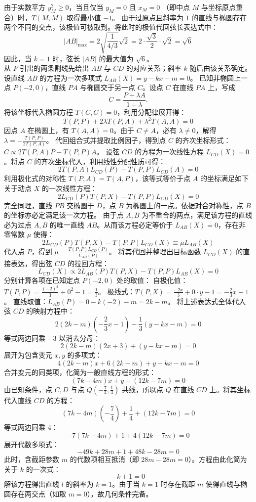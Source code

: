 \begin{solution}
由于实数平方 $y_M^2 \ge 0$，当且仅当 $y_M = 0$ 且 $x_M = 0$ （即中点 $M$ 与坐标原点重合）时，$T(M, M)$ 取得最小值 $-1$。
由于过原点且斜率为 $1$ 的直线与椭圆存在两个不同的交点，该极值可被取到。将此时的极值代回弦长表达式中：
\[ |AB|_{\max} = 2\sqrt{\frac{1}{4/3}} \sqrt{2} = 2 \cdot \frac{\sqrt{3}}{2} \cdot \sqrt{2} = \sqrt{6} \]
因此，当 $k=1$ 时，弦长 $|AB|$ 的最大值为 $\sqrt{6}$。\\
从 $P$ 引出的两条割线先给出 $AB$ 与 $CD$ 的对应关系；斜率 $k$ 随后由该关系确定。
设直线 $AB$ 的方程为一次多项式 $L_{AB}(X) = y - kx - m = 0$。
已知非椭圆上一点 $P(-2, 0)$，直线 $PA$ 与椭圆交于另一点 $C$。设点 $C$ 在直线 $PA$ 上，写成
\[ C = \frac{P + \lambda A}{1+\lambda}. \]
将该坐标代入椭圆方程 $T(C, C) = 0$，利用分配律展开得：
\[ T(P, P) + 2\lambda T(P, A) + \lambda^2 T(A, A) = 0 \]
因点 $A$ 在椭圆上，有 $T(A, A) = 0$。由于 $C \neq A$，必有 $\lambda \neq 0$，解得 $\lambda = -\frac{T(P, P)}{2T(P, A)}$。
代回组合式并提取比例因子，得到点 $C$ 的齐次坐标形式：$C \propto 2T(P, A)P - T(P, P)A$。
设弦 $CD$ 的方程为一次线性方程 $L_{CD}(X) = 0$。将点 $C$ 的齐次坐标代入，利用线性分配性质可得：
\[ 2T(P, A)L_{CD}(P) - T(P, P)L_{CD}(A) = 0 \]
利用极化式的对称性 $T(P, A) = T(A, P)$，该等式等价于点 $A$ 的坐标满足如下关于动点 $X$ 的一次线性方程：
\[ 2L_{CD}(P)T(P, X) - T(P, P)L_{CD}(X) = 0 \]
完全同理，直线 $PB$ 交椭圆于 $D$，点 $B$ 为椭圆上的一点。依据对合对称性，点 $B$ 的坐标亦必定满足该一次方程。
由于点 $A, B$ 为不重合的两点，满足该方程的直线必为过点 $A, B$ 的唯一直线 $AB$。从而该方程必定等价于 $L_{AB}(X) = 0$，存在非零常数 $\mu$ 使得：
\[ 2L_{CD}(P)T(P, X) - T(P, P)L_{CD}(X) \equiv \mu L_{AB}(X) \]
代入点 $P$，得到 $\mu = \frac{T(P, P)L_{CD}(P)}{L_{AB}(P)}$。
将其代回并整理出目标函数 $L_{CD}(X)$ 的直接表达，得出弦 $CD$ 的拉回方程：
\[ L_{CD}(X) \propto 2L_{AB}(P)T(P, X) - T(P, P)L_{AB}(X) = 0 \]
分别计算各项在已知定点 $P(-2, 0)$ 处的取值：
自极化值：$T(P, P) = \frac{(-2)^2}{3} + 0^2 - 1 = \frac{1}{3}$。
极线式：$T(P, X) = \frac{-2x}{3} + 0 \cdot y - 1 = -\frac{2}{3}x - 1$。
直线取值：$L_{AB}(P) = 0 - k(-2) - m = 2k - m$。
将上述表达式全体代入弦 $CD$ 的映射方程中：
\[ 2(2k - m)\left(-\frac{2}{3}x - 1\right) - \frac{1}{3}(y - kx - m) = 0 \]
等式两边同乘 $-3$ 以消去分母：
\[ 2(2k - m)(2x + 3) + (y - kx - m) = 0 \]
展开为包含变元 $x, y$ 的多项式：
\[ 4(2k - m)x + 6(2k - m) + y - kx - m = 0 \]
合并变元的同类项，化简为一般直线方程的形式：
\[ (7k - 4m)x + y + (12k - 7m) = 0 \]
由已知条件，点 $C, D$ 与点 $Q\left(-\frac{7}{4}, \frac{1}{4}\right)$ 共线，所以点 $Q$ 在直线 $CD$ 上。将其坐标代入直线 $CD$ 的方程：
\[ (7k - 4m)\left(-\frac{7}{4}\right) + \frac{1}{4} + (12k - 7m) = 0 \]
等式两边同乘 $4$：
\[ -7(7k - 4m) + 1 + 4(12k - 7m) = 0 \]
展开代数多项式：
\[ -49k + 28m + 1 + 48k - 28m = 0 \]
此时，含截距参数 $m$ 的代数项相互抵消（即 $28m - 28m = 0$）。方程由此化简为关于 $k$ 的一次式：
\[ -k + 1 = 0 \]
解该方程得出直线 $l$ 的斜率为 $k = 1$。由于当 $k=1$ 时存在截距 $m$ 使得直线与椭圆存在两交点（如取 $m=0$），故几何条件完备。
\end{solution}


